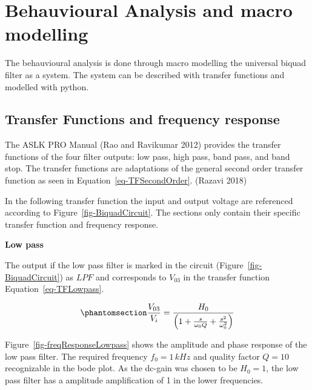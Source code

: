 \documentclass[
  letterpaper,
]{scrbook}
\begin{document}
\section{Behauvioural Analysis and macro
modelling}\label{behauvioural-analysis-and-macro-modelling}

The behauvioural analysis is done through macro modelling the universal
biquad filter as a system. The system can be described with transfer
functions and modelled with python.

\subsection{Transfer Functions and frequency
response}\label{transfer-functions-and-frequency-response}

The ASLK PRO Manual (Rao and Ravikumar 2012) provides the transfer
functions of the four filter outputs: low pass, high pass, band pass,
and band stop. The transfer functions are adaptations of the general
second order transfer function as seen in
Equation~\ref{eq-TFSecondOrder}. (Razavi 2018)

In the following transfer function the input and output voltage are
referenced according to Figure~\ref{fig-BiquadCircuit}. The sections
only contain their specific transfer function and frequency response.

\textbf{Low pass}

The output if the low pass filter is marked in the circuit
(Figure~\ref{fig-BiquadCircuit}) as \(LPF\) and corresponds to
\(V_{03}\) in the transfer function Equation~\ref{eq-TFLowpass}.

\begin{equation}\phantomsection\label{eq-TFLowpass}{
\frac{V_{03}}{V_i} = \frac{H_0}{\left( 1 + \frac{s}{\omega_0 Q} + \frac{s^2}{\omega_0^2} \right)}
}\end{equation}

Figure~\ref{fig-freqResponseLowpass} shows the amplitude and phase
response of the low pass filter. The required frequency \(f_0 = 1\,kHz\)
and quality factor \(Q = 10\) recognizable in the bode plot. As the
dc-gain was chosen to be \(H_0 = 1\), the low pass filter has a
amplitude amplification of 1 in the lower frequencies.
\end{document}
